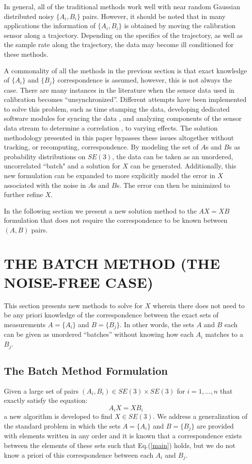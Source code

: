 \documentclass[twocolumn,10pt]{asme2ej}
\begin{document}
{In general, all of the traditional methods work well with near random Gaussian distributed noisy $\{A_{i},B_{i}\}$ pairs. However, it should be noted that in many applications the information of $\{A_{i},B_{i}\}$ is obtained by moving the calibration sensor along a trajectory. Depending on the specifics of the trajectory, as well as the sample rate along the trajectory, the data may become ill conditioned for these methods.}

A commonality of all the methods in the previous section is that exact knowledge of $\{A_i\}$ and $\{B_j\}$ correspondence is assumed, however, this is not always the case. There are many instances in the literature when the sensor data used in calibration becomes ``unsynchronized''. Different attempts have been implemented to solve this problem, such as time stamping the data, developing dedicated software modules for syncing the data \cite{alexis9}, and analyzing components of the sensor data stream to determine a correlation \cite{darius1}, to varying effects. The solution methodology presented in this paper bypasses these issues altogether without tracking, or recomputing, correspondence. By modeling the set of $A$s and $B$s as probability distributions on $SE(3)$, the data can be taken as an unordered, uncorrelated ``batch" and a solution for $X$ can be generated. Additionally, this new formulation can be expanded to more explicitly model the error in $X$ associated with the noise in $A$s and $B$s. The error can then be minimized to further refine $X$.

In the following section we present a new solution method to the $AX=XB$ formulation that does not require the correspondence to be known between $(A, B)$ pairs.
\section{THE BATCH METHOD (THE NOISE-FREE CASE)}
\label{batchnoisefree}

This section presents new methods to solve for $X$ wherein there does not need to be any priori knowledge of the correspondence between the exact sets of measurements
$A = \{A_i\}$ and $B = \{B_j\}$. In other words, the sets $A$ and $B$ each can be given as unordered ``batches'' without knowing how each $A_i$ matches to a $B_j$.

\subsection{The Batch Method Formulation}
Given a large set of pairs $(A_i,B_i) \in SE(3) \times SE(3)$ for $i =1,...,n$ that exactly satisfy the equation:
\begin{equation} A_i X = X B_i \label{main} \end{equation}
a new algorithm is developed to find $X \in SE(3)$. We address a generalization of the standard problem in which
the sets $A=\{A_i\}$ and $B =\{B_j\}$ are provided with elements written in any order and it is known that a correspondence exists between the elements of these sets such that Eq.(\ref{main}) holds, but we do not know a priori of this correspondence between each $A_i$ and $B_j$.
\end{document}
